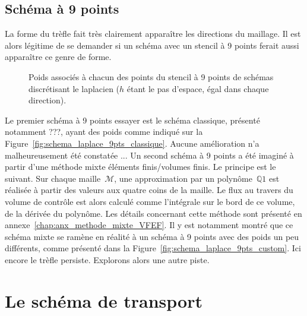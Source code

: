 \documentclass[main.tex]{subfiles}
\begin{document}
\subsection{Schéma à 9 points}
La forme du trèfle fait très clairement apparaître les directions du maillage. Il est alors légitime de se demander si un schéma avec un stencil à 9 points ferait aussi apparaître ce genre de forme. 
\begin{figure}
\caption{\label{fig:schema_laplacien}Poids associés à chacun des points du stencil à 9 points de schémas discrétisant le laplacien ($h$ étant le pas d'espace, égal dans chaque direction).}
\end{figure}
Le premier schéma à 9 points essayer est le schéma classique, présenté notamment ???, ayant des poids comme indiqué sur la Figure~\ref{fig:schema_laplace_9pts_classique}. Aucune amélioration n'a malheureusement été constatée ... Un second schéma à 9 points a été imaginé à partir d'une méthode mixte éléments finis/volumes finis. Le principe est le suivant.  
Sur chaque maille~$\mathcal{M}$, une approximation par un polynôme~$\mathbb{Q}1$ est réalisée à partir des valeurs aux quatre coins de la maille. Le flux au travers du volume de contrôle est alors calculé comme l'intégrale sur le bord de ce volume, de la dérivée du polynôme. Les détails concernant cette méthode sont présenté en  annexe~\ref{chap:anx_methode_mixte_VFEF}. Il y est notamment montré que ce schéma mixte se ramène en réalité à un schéma à 9 points avec des poids un peu différents, comme présenté dans la Figure~\ref{fig:schema_laplace_9pts_custom}. 
Ici encore le trèfle persiste. Explorons alors une autre piste.

\section{Le schéma de transport}
\end{document}
